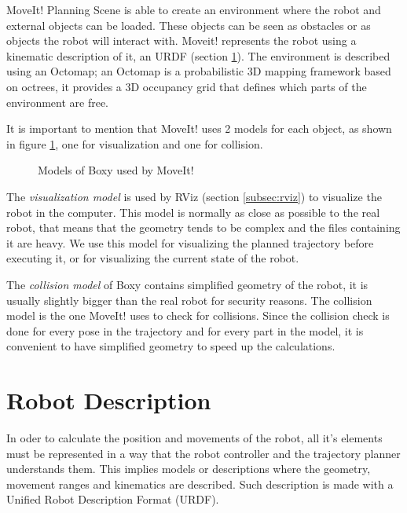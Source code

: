 MoveIt! Planning Scene is able to create an environment where the robot and external objects can be loaded. These objects can be seen as obstacles or as objects the robot will interact with. Moveit! represents the robot using a kinematic description of it, an URDF (section \ref{sec:urdf}). The environment is described using an Octomap; an Octomap is a probabilistic 3D mapping framework based on octrees, it provides a 3D occupancy grid that defines which parts of the environment are free.

It is important to mention that MoveIt! uses 2 models for each object, as shown in figure \ref{fig:models}, one for visualization and one for collision. 
\begin{figure}[H]
	\centering
	\begin{subfigure}[][Visualization Model]
		{\texttt{[image: boxy/visual.png]}}
	\end{subfigure}
	\begin{subfigure}[][Collision Model]
		{\texttt{[image: boxy/collision.png]}}
	\end{subfigure}
	\vspace{-15pt}
	\caption{Models of Boxy used by MoveIt!}
	\vspace{-10pt}
	\label{fig:models}
\end{figure}

The \textit{visualization model} is used by RViz (section \ref{subsec:rviz}) to visualize the robot in the computer. This model is normally as close as possible to the real robot, that means that the geometry tends to be complex and the files containing it are heavy. We use this model for visualizing the planned trajectory before executing it, or for visualizing the current state of the robot.

The \textit{collision model} of Boxy contains simplified geometry of the robot, it is usually slightly bigger than the real robot for security reasons. The collision model is the one MoveIt! uses to check for collisions. Since the collision check is done for every pose in the trajectory and for every part in the model, it is convenient to have simplified geometry to speed up the calculations. 

\section{Robot Description}
\label{sec:urdf}

In oder to calculate the position and movements of the robot, all it's elements must be  represented in a way that the robot controller and the trajectory planner understands them. This implies models or descriptions where the geometry, movement ranges and kinematics are described. Such description is made with a Unified Robot Description Format (URDF).

